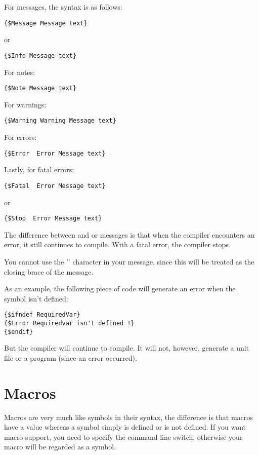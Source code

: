 For messages, the syntax is as follows:
\begin{verbatim}
{$Message Message text}
\end{verbatim}
or
\begin{verbatim}
{$Info Message text}
\end{verbatim}
For notes:
\begin{verbatim}
{$Note Message text}
\end{verbatim}
For warnings:
\begin{verbatim}
{$Warning Warning Message text}
\end{verbatim}
For errors:
\begin{verbatim}
{$Error  Error Message text}
\end{verbatim}
Lastly, for fatal errors:
\begin{verbatim}
{$Fatal  Error Message text}
\end{verbatim}
or
\begin{verbatim}
{$Stop  Error Message text}
\end{verbatim}
The difference between  and  or 
messages is that when the compiler encounters an error, it still continues
to compile. With a fatal error, the compiler stops.

\begin{remark}You cannot use the '\var{\}}' character in your message, since
this will be treated as the closing brace of the message.
\end{remark}
As an example, the following piece of code will generate an error when
the symbol  isn't defined:
\begin{verbatim}
{$ifndef RequiredVar}
{$Error Requiredvar isn't defined !}
{$endif}
\end{verbatim}
But the compiler will continue to compile. It will not, however, generate a
unit file or a program (since an error occurred).

\section{Macros}
\label{se:Macros}
Macros are very much like symbols in their syntax, the difference is that
macros have a value whereas a symbol simply is defined or is not defined.
If you want macro support, you need to specify the  command-line
switch, otherwise your macro will be regarded as a symbol.

